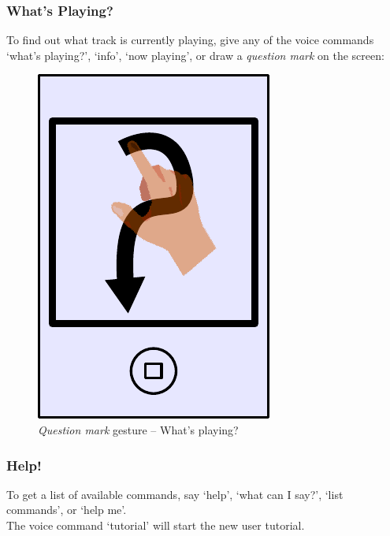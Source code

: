 \documentclass[12pt,letterpaper]{article}
\begin{document}
\subsubsection*{What's Playing?}
To find out what track is currently playing, give any of the voice commands `what's playing?', `info', `now playing',  or draw a \emph{question mark} on the screen:
\begin{figure}[H]
	\centering
	\includegraphics[scale=0.6]{question}
	\caption{\emph{Question mark} gesture -- What's playing?}
\end{figure}
\subsubsection*{Help!}
To get a list of available commands, say `help', `what can I say?', `list commands', or `help me'. \\
{\color{magenta}The voice command `tutorial' will start the new user tutorial.}
\end{document}
